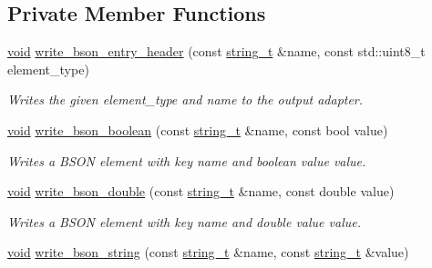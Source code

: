 \subsection*{Private Member Functions}
\begin{DoxyCompactItemize}
\item 
\hyperlink{namespacenlohmann_1_1detail_a59fca69799f6b9e366710cb9043aa77d}{void} \hyperlink{classnlohmann_1_1detail_1_1binary__writer_a1b5b7f5c03b1f8b1f59ea61db9634108}{write\+\_\+bson\+\_\+entry\+\_\+header} (const \hyperlink{classnlohmann_1_1detail_1_1binary__writer_a29f2ae7a5c4a8c1dae47b3b2310de8a8}{string\+\_\+t} \&name, const std\+::uint8\+\_\+t element\+\_\+type)
\begin{DoxyCompactList}\small\item\em Writes the given {\itshape element\+\_\+type} and {\itshape name} to the output adapter. \end{DoxyCompactList}\item 
\hyperlink{namespacenlohmann_1_1detail_a59fca69799f6b9e366710cb9043aa77d}{void} \hyperlink{classnlohmann_1_1detail_1_1binary__writer_ae099435e1df3096e0fc78333282f8f67}{write\+\_\+bson\+\_\+boolean} (const \hyperlink{classnlohmann_1_1detail_1_1binary__writer_a29f2ae7a5c4a8c1dae47b3b2310de8a8}{string\+\_\+t} \&name, const bool value)
\begin{DoxyCompactList}\small\item\em Writes a B\+S\+ON element with key {\itshape name} and boolean value {\itshape value}. \end{DoxyCompactList}\item 
\hyperlink{namespacenlohmann_1_1detail_a59fca69799f6b9e366710cb9043aa77d}{void} \hyperlink{classnlohmann_1_1detail_1_1binary__writer_a263ec18815467bb9919021ef126919ca}{write\+\_\+bson\+\_\+double} (const \hyperlink{classnlohmann_1_1detail_1_1binary__writer_a29f2ae7a5c4a8c1dae47b3b2310de8a8}{string\+\_\+t} \&name, const double value)
\begin{DoxyCompactList}\small\item\em Writes a B\+S\+ON element with key {\itshape name} and double value {\itshape value}. \end{DoxyCompactList}\item 
\hyperlink{namespacenlohmann_1_1detail_a59fca69799f6b9e366710cb9043aa77d}{void} \hyperlink{classnlohmann_1_1detail_1_1binary__writer_a5e6574416915208fc035b57338ae3252}{write\+\_\+bson\+\_\+string} (const \hyperlink{classnlohmann_1_1detail_1_1binary__writer_a29f2ae7a5c4a8c1dae47b3b2310de8a8}{string\+\_\+t} \&name, const \hyperlink{classnlohmann_1_1detail_1_1binary__writer_a29f2ae7a5c4a8c1dae47b3b2310de8a8}{string\+\_\+t} \&value)

\end{DoxyCompactItemize}
